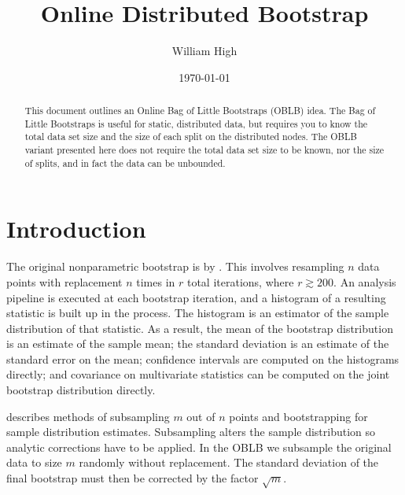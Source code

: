 \documentclass{article}
\begin{document}
%

\title{Online Distributed Bootstrap}
\author{William High}
\date{\today}
\maketitle

\begin{abstract}

This document outlines an Online Bag of Little Bootstraps (OBLB) idea. The Bag
of Little Bootstraps is useful for static, distributed data, but requires you
to know the total data set size and the size of each split on the distributed
nodes. The OBLB variant presented here does not require the total data set
size to be known, nor the size of splits, and in fact the data can be
unbounded.

\end{abstract}

\section{Introduction}

The original nonparametric bootstrap is by \cite{bib:efron}. This involves resampling $n$ data points with replacement
$n$ times in $r$ total iterations, where $r \gtrsim 200$. An analysis pipeline
is executed at each bootstrap iteration, and a histogram of a resulting
statistic is built up in the process. The histogram is an estimator of the
sample distribution of that statistic. As a result, the mean of the bootstrap
distribution is an estimate of the sample mean; the standard deviation is an
estimate of the standard error on the mean; confidence intervals are computed
on the histograms directly; and covariance on multivariate statistics can be
computed on the joint bootstrap distribution directly.

\cite{bib:mofnboot} describes methods of subsampling $m$ out of $n$ points and bootstrapping for sample distribution estimates.  Subsampling alters the sample distribution so analytic corrections have to be applied.  In the OBLB we subsample the original data to size $m$ randomly without replacement.  The standard deviation of the final bootstrap must then be corrected by the factor $\sqrt{m}$.
\end{document}
